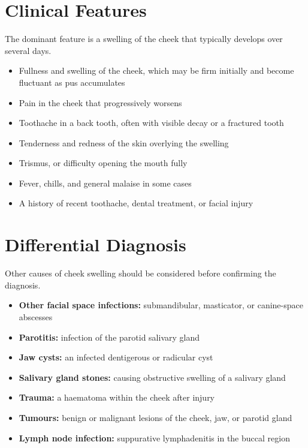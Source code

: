 \section*{Clinical Features}
The dominant feature is a swelling of the cheek that typically develops over several days.

\begin{itemize}
    \item Fullness and swelling of the cheek, which may be firm initially and become fluctuant as pus accumulates
    \item Pain in the cheek that progressively worsens
    \item Toothache in a back tooth, often with visible decay or a fractured tooth
    \item Tenderness and redness of the skin overlying the swelling
    \item Trismus, or difficulty opening the mouth fully
    \item Fever, chills, and general malaise in some cases
    \item A history of recent toothache, dental treatment, or facial injury
\end{itemize}

\section*{Differential Diagnosis}
Other causes of cheek swelling should be considered before confirming the diagnosis.

\begin{itemize}
    \item \textbf{Other facial space infections:} submandibular, masticator, or canine-space abscesses
    \item \textbf{Parotitis:} infection of the parotid salivary gland
    \item \textbf{Jaw cysts:} an infected dentigerous or radicular cyst
    \item \textbf{Salivary gland stones:} causing obstructive swelling of a salivary gland
    \item \textbf{Trauma:} a haematoma within the cheek after injury
    \item \textbf{Tumours:} benign or malignant lesions of the cheek, jaw, or parotid gland
    \item \textbf{Lymph node infection:} suppurative lymphadenitis in the buccal region
\end{itemize}

